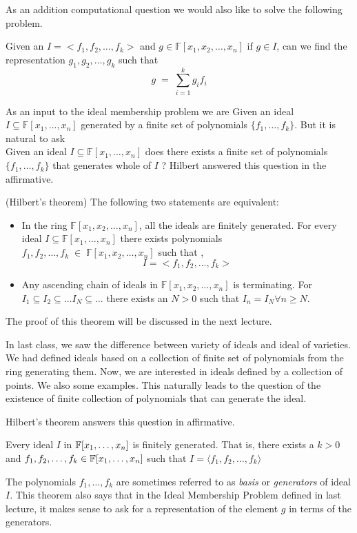 As an addition computational question we would also like to solve the following problem.


Given an $I = <f_1,f_2, \ldots, f_k>$ and $g \in \mathbb{F}[x_1,x_2,\ldots,x_n]$ if $g\in I$, can we find the representation $g_1,g_2,\ldots,g_k$ such that $$
	g\;=\;\sum_{i=1}^k g_if_i
$$

As an input to the ideal membership problem we are 
Given an ideal $I\subseteq\mathbb{F}[x_1,\ldots,x_n]$ generated by a finite set of polynomials $\{f_1,\ldots,f_k\}$. But it is natural to ask \\
Given an ideal $I\subseteq\mathbb{F}[x_1,\ldots,x_n]$ does there exists a finite set of polynomials $\{f_1,\ldots,f_k\}$ that generates whole of $I$ ? Hilbert answered this question in the affirmative.


\begin{theorem}(Hilbert's theorem)
The following two statements are equivalent:
\begin{itemize}
\item In the ring $\mathbb{F}[x_1,x_2,\ldots,x_n]$, all the ideals are finitely generated. For every ideal $ I\subseteq \mathbb{F}[x_1,\ldots,x_n]$ there exists polynomials $f_1,f_2,\ldots,f_k\;\in\;\mathbb{F}[x_1,x_2,\ldots,x_n]$ 
such that ,$$I = <f_1,f_2,\ldots,f_k>$$
\item Any ascending chain of ideals in $\mathbb{F}[x_1,x_2,\ldots,x_n]$ is terminating. For $I_1 \subseteq I_2\subseteq\ldots I_N \subseteq \ldots$
there exists an $N > 0$ such that $I_n = I_N \forall n \geq N$.
\end{itemize}
\end{theorem}
The proof of this theorem will be discussed in the next lecture.

In last class, we saw the difference between variety of ideals and ideal of
varieties. We had defined ideals based on a collection of finite set of
polynomials from the ring generating them. Now, we are interested in
ideals defined by a collection of points. We also some examples. This
naturally leads to the question of the existence of finite collection of
polynomials that can generate the ideal.

Hilbert's theorem answers this question in affirmative.
\begin{theorem}
	Every ideal $I$ in ${\mathbb{F}}[x_1,\ldots,x_n]$ is finitely generated. That
	is, there exists a $k > 0$ and $f_1,f_2,\ldots,f_k \in
	{\mathbb{F}}[x_1,\ldots,x_n]$ such that $I = \langle f_1,f_2,\ldots,f_k \rangle
	$
	\label{thm:hbt}
\end{theorem}
The polynomials $f_1,\ldots,f_k$ are sometimes referred to as \emph{basis} or
\emph{generators} of ideal $I$. This theorem also says that in the Ideal
Membership Problem defined in last
lecture, it makes sense to ask for a representation of the element $g$ in
terms of the generators. 

